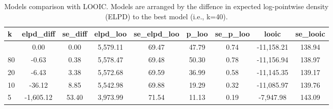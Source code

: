 \documentclass[
  doc,
  floatsintext,
  longtable,
  a4paper,
  nolmodern,
  notxfonts,
  notimes,
  colorlinks=true,linkcolor=blue,citecolor=blue,urlcolor=blue]{apa7}
\begin{document}
\begin{table}

{\caption{{Models comparison with LOOIC. Models are arranged by the
diffence in expected log-pointwise density (ELPD) to the best model
(i.e., k=40).}{\label{tbl-k-results}}}}

\fontsize{7.5pt}{9.0pt}\selectfont
\begin{tabular*}{\linewidth}{@{\extracolsep{\fill}}lcccccccc}
\toprule
k & elpd\_diff & se\_diff & elpd\_loo & se\_elpd\_loo & p\_loo & se\_p\_loo & looic & se\_looic \\ 
\midrule\addlinespace[2.5pt]
40 & 0.00 & 0.00 & 5,579.11 & 69.47 & 47.79 & 0.74 & -11,158.21 & 138.94 \\ 
80 & -0.63 & 0.38 & 5,578.47 & 69.48 & 50.30 & 0.78 & -11,156.94 & 138.97 \\ 
20 & -6.43 & 3.38 & 5,572.68 & 69.59 & 36.99 & 0.58 & -11,145.35 & 139.17 \\ 
10 & -36.12 & 8.85 & 5,542.98 & 69.88 & 19.29 & 0.32 & -11,085.97 & 139.76 \\ 
5 & -1,605.12 & 53.40 & 3,973.99 & 71.54 & 11.13 & 0.19 & -7,947.98 & 143.09 \\ 
\bottomrule
\end{tabular*}

\end{table}
\end{document}
